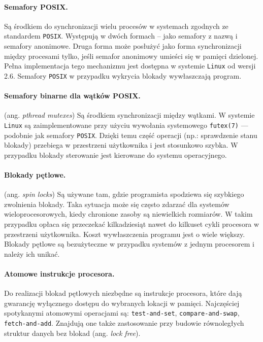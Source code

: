 \documentclass[12pt,a4paper,titlepage,twoside]{mwart}
\begin{document}
\paragraph{Semafory POSIX.} Są środkiem do synchronizacji wielu procesów w
systemach zgodnych ze standardem \texttt{POSIX}. Występują w dwóch formach --
jako semafory z nazwą i semafory anonimowe. Druga forma może posłużyć jako
forma synchronizacji między procesami tylko, jeśli semafor anonimowy umieści
się w pamięci dzielonej. Pełna implementacja tego mechanizmu jest dostępna w
systemie \texttt{Linux} od wersji 2.6. Semafory \texttt{POSIX} w przypadku
wykrycia blokady wywłaszczają program.

\paragraph{Semafory binarne dla wątków POSIX.} (ang. \textit{pthread mutexes})
Są środkiem synchronizacji między wątkami. W systemie \texttt{Linux} są
zaimplementowane przy użyciu wywołania systemowego \verb+futex(7)+ --- podobnie
jak semafory \texttt{POSIX}. Dzięki temu część operacji (np.: sprawdzenie stanu
blokady) przebiega w przestrzeni użytkownika i jest stosunkowo szybka. W
przypadku blokady sterowanie jest kierowane do systemu operacyjnego. 

\paragraph{Blokady pętlowe.} (ang. \textit{spin locks}) Są używane tam, gdzie
programista spodziewa się szybkiego zwolnienia blokady. Taka sytuacja może się
często zdarzać dla systemów wieloprocesorowych, kiedy chronione zasoby są
niewielkich rozmiarów. W takim przypadku opłaca się przeczekać kilkadziesiąt
nawet do kilkuset cykli procesora w przestrzeni użytkownika. Koszt
wywłaszczenia programu jest o wiele większy. Blokady pętlowe są bezużyteczne w
przypadku systemów z jednym procesorem i należy ich unikać.

\paragraph{Atomowe instrukcje procesora.} Do realizacji blokad pętlowych
niezbędne są instrukcje procesora, które dają gwarancję wyłącznego dostępu do
wybranych lokacji w pamięci. Najczęściej spotykanymi atomowymi operacjami są:
\texttt{test-and-set}, \texttt{compare-and-swap}, \texttt{fetch-and-add}.
Znajdują one także zastosowanie przy budowie równoległych struktur danych bez
blokad (ang. \textit{lock free}).
\end{document}
